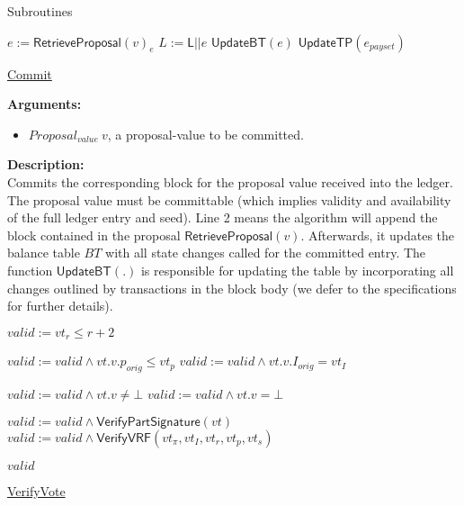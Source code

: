 \documentclass[10pt,a4paper]{article}
\begin{document}
\begin{section}{Subroutines}
\begin{algorithm}[H]
\begin{algorithmic}[1]
    \State $e := \mathsf{RetrieveProposal}(v)_e$ 
    \State $L := \mathsf{L} || e$
    \State $\mathsf{UpdateBT}(e)$
    \State $\mathsf{UpdateTP}(e_{payset})$

    \EndFunction
    \end{algorithmic}
    \caption{\underline{Commit}}
\end{algorithm}


\noindent \textbf{Arguments:}
\begin{itemize}
    \item $Proposal_{value} \ v$, a proposal-value to be committed.
  \end{itemize}

\noindent \textbf{Description:}\\
Commits the corresponding block for the proposal value received into the ledger.
The proposal value must be committable (which implies validity and availability of the full
ledger entry and seed).
Line 2 means the algorithm will append the block contained in the proposal $\mathsf{RetrieveProposal}(v)$.
Afterwards, it updates the balance table $BT$ with all state changes called for the committed entry.
The function $\mathsf{UpdateBT}(.)$ is responsible for updating the table by incorporating all changes
outlined by transactions in the block body (we defer to the specifications for further details). 


\begin{algorithm}[H]\label{algo:verify-vote}
    \begin{algorithmic}[1]
        \State $valid := vt_r \leq r+2$
        
            \State $valid := valid \land vt.v.p_{orig} \leq vt_p$
                \State $valid := valid \land vt.v.I_{orig} = vt_I$
            \EndIf
        \EndIf
        
            \State $valid := valid \land vt.v \neq \bot$
            \State $valid := valid \land vt.v = \bot$
        \EndIf

        \State $valid := valid \land \mathsf{VerifyPartSignature}(vt)$
        \State $valid := valid \land \mathsf{VerifyVRF}(vt_{\pi}, vt_I, vt_r, vt_p, vt_s)$

        \State \Return $valid$
    \EndFunction
    \end{algorithmic}
    \caption{\underline{VerifyVote}}
\end{algorithm}


\end{section}
\end{document}
